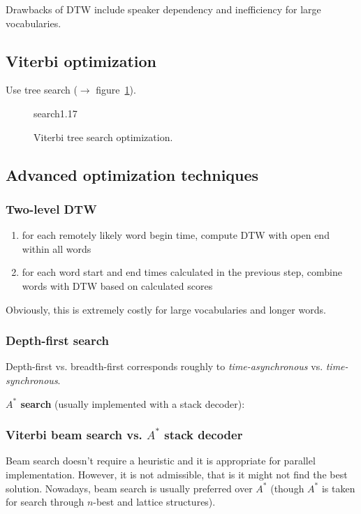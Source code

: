 \documentclass[11pt]{article}
\begin{document}
Drawbacks of DTW include speaker dependency and inefficiency for large vocabularies.

\subsection{Viterbi optimization}
Use tree search ($\to$ figure~\ref{fig:viterbiTreeSearchOptimization}).
\begin{figure}[htb]
    \begin{minipage}{\linewidth}
        \vspace{5cm}
        \hfill \scriptsize search1.17
    \end{minipage}
    \caption{\label{fig:viterbiTreeSearchOptimization} Viterbi tree search optimization.}
\end{figure}

\subsection{Advanced optimization techniques}

\subsubsection{Two-level DTW}
\begin{enumerate}
    \item for each remotely likely word begin time, compute DTW with open end within all words
    \item for each word start and end times calculated in the previous step, combine words with DTW based on calculated scores
\end{enumerate}

Obviously, this is extremely costly for large vocabularies and longer words.

\subsubsection{Depth-first search}

Depth-first vs. breadth-first corresponds roughly to \textit{time-asynchronous} vs. \textit{time-synchronous}.

\textbf{$A^{\ast}$ search} (usually implemented with a stack decoder):

\subsubsection{Viterbi beam search vs. $A^{\ast}$ stack decoder}
Beam search doesn't require a heuristic and it is appropriate for parallel implementation. However, it is not admissible, that is it might not find the best solution. Nowadays, beam search is usually preferred over $A^{\ast}$ (though $A^{\ast}$ is taken for search through $n$-best and lattice structures).
\end{document}
